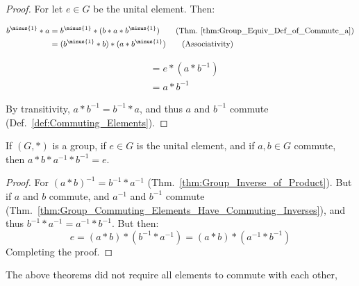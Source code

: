     \begin{proof}
        For let $e\in{G}$ be the unital element. Then:
        \par
        \begin{minipage}[t]{0.56\textwidth}
            \centering
            \begin{align}
                b^{\minus{1}}*a
                &=b^{\minus{1}}*(b*a*b^{\minus{1}})
                \tag{Thm.~\ref{thm:Group_Equiv_Def_of_Commute_a}}\\
                &=(b^{\minus{1}}*b)*(a*b^{\minus{1}})
                \tag{Associativity}
            \end{align}
        \end{minipage}
        \hfill
        \begin{minipage}[t]{0.42\textwidth}
            \centering
            \begin{align}
                &=e*(a*b^{\minus{1}})
                \tag{Inverse}\\
                &=a*b^{\minus{1}}
                \tag{Identity}
            \end{align}
        \end{minipage}
        \par\vspace{2.5ex}
        By transitivity, $a*b^{\minus{1}}=b^{\minus{1}}*a$, and thus $a$ and
        $b^{\minus{1}}$ commute (Def.~\ref{def:Commuting_Elements}).
    \end{proof}
    \begin{theorem}
        If $(G,*)$ is a group, if $e\in{G}$ is the unital element, and if
        $a,b\in{G}$ commute, then $a*b*a^{\minus{1}}*b^{\minus{1}}=e$.
    \end{theorem}
    \begin{proof}
        For $(a*b)^{\minus{1}}=b^{\minus{1}}*a^{\minus{1}}$
        (Thm.~\ref{thm:Group_Inverse_of_Product}). But if $a$ and $b$ commute,
        and $a^{\minus{1}}$ and $b^{\minus{1}}$ commute
        (Thm.~\ref{thm:Group_Commuting_Elements_Have_Commuting_Inverses}),
        and thus $b^{\minus{1}}*a^{\minus{1}}=a^{\minus{1}}*b^{\minus{1}}$.
        But then:
        \begin{equation}
            e=(a*b)*(b^{\minus{1}}*a^{\minus{1}})
            =(a*b)*(a^{\minus{1}}*b^{\minus{1}})
        \end{equation}
        Completing the proof.
    \end{proof}
    The above theorems did not require all elements to commute with each other,
